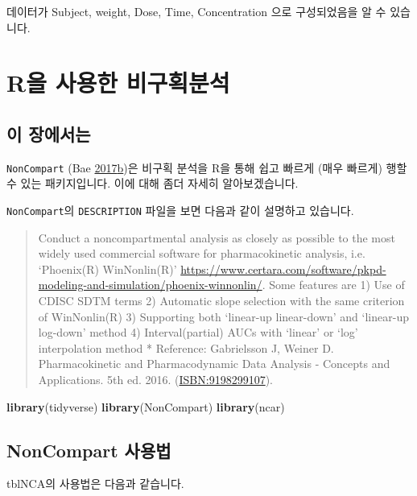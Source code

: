\documentclass[12pt,]{krantz}
\newenvironment{Shaded}{\begin{snugshade}}{\end{snugshade}}
\newcommand{\KeywordTok}[1]{\textcolor[rgb]{0.13,0.29,0.53}{\textbf{#1}}}
\newcommand{\NormalTok}[1]{#1}
\theoremstyle{definition}
\theoremstyle{definition}
\theoremstyle{definition}
\theoremstyle{remark}
\begin{document}
데이터가 Subject, weight, Dose, Time, Concentration 으로 구성되었음을 알
수 있습니다.

\chapter{R을 사용한 비구획분석}\label{noncompart}

\section{이 장에서는}\label{summary-noncompart}

\texttt{NonCompart} (Bae
\protect\hyperlink{ref-R-NonCompart}{2017}\protect\hyperlink{ref-R-NonCompart}{b})은
비구획 분석을 R을 통해 쉽고 빠르게 (매우 빠르게) 행할 수 있는
패키지입니다. 이에 대해 좀더 자세히 알아보겠습니다.

\texttt{NonCompart}의 \texttt{DESCRIPTION} 파일을 보면 다음과 같이
설명하고 있습니다.

\begin{quote}
Conduct a noncompartmental analysis as closely as possible to the most
widely used commercial software for pharmacokinetic analysis, i.e.
`Phoenix(R) WinNonlin(R)'
\url{https://www.certara.com/software/pkpd-modeling-and-simulation/phoenix-winnonlin/}.
Some features are 1) Use of CDISC SDTM terms 2) Automatic slope
selection with the same criterion of WinNonlin(R) 3) Supporting both
`linear-up linear-down' and `linear-up log-down' method 4)
Interval(partial) AUCs with `linear' or `log' interpolation method *
Reference: Gabrielsson J, Weiner D. Pharmacokinetic and Pharmacodynamic
Data Analysis - Concepts and Applications. 5th ed. 2016.
(\url{ISBN:9198299107}).
\end{quote}

\begin{Shaded}
\begin{Highlighting}[]
\KeywordTok{library}\NormalTok{(tidyverse)}
\KeywordTok{library}\NormalTok{(NonCompart)}
\KeywordTok{library}\NormalTok{(ncar)}
\end{Highlighting}
\end{Shaded}

\section{NonCompart 사용법}\label{how-to-use}

tblNCA의 사용법은 다음과 같습니다.
\end{document}
